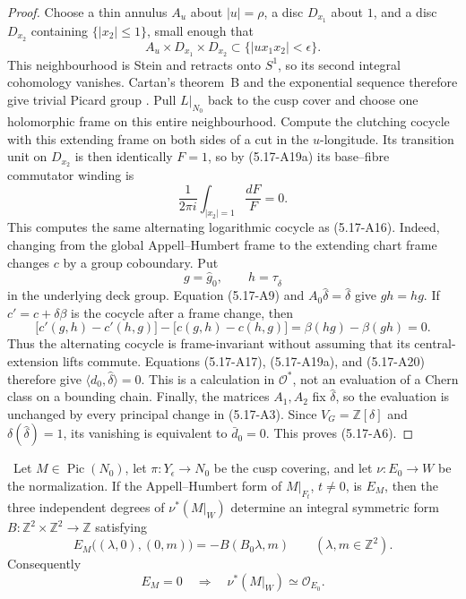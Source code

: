 \begin{proof}
Choose a thin annulus \(A_u\) about \(|u|=\rho\), a disc \(D_{x_1}\)
about \(1\), and a disc \(D_{x_2}\) containing \(\{|x_2|\le1\}\), small
enough that
\[
 A_u\times D_{x_1}\times D_{x_2}
 \subset\{|ux_1x_2|<\epsilon\}.
\tag{5.17-A19c}
\]
This neighbourhood is Stein and retracts onto \(S^1\), so its second
integral cohomology vanishes.  Cartan's theorem~B and the exponential
sequence therefore give trivial Picard group
\cite[\S2, fundamental theorem, p.~81]{Cartan1957}%
\cite[Proposition~6.28 and equations~(6.35)--(6.36),
pp.~180--182]{Lee2024}.  Pull \(L|_{N_0}\) back to
the cusp cover and choose one holomorphic frame on this entire
neighbourhood.  Compute the clutching cocycle with this extending frame on
both sides of a cut in the \(u\)-longitude.  Its transition unit on
\(D_{x_2}\) is then identically \(F=1\), so by (5.17-A19a) its
base--fibre commutator winding is
\[
 \frac1{2\pi i}\int_{|x_2|=1}\frac{dF}{F}=0.
\tag{5.17-A20}
\]
This computes the same alternating logarithmic cocycle as (5.17-A16).
Indeed, changing from the global Appell--Humbert frame to the extending
chart frame changes \(c\) by a group coboundary.  Put
\[
 g=\widehat g_0,
 \qquad
 h=\tau_{\widehat\delta}
\]
in the underlying deck group.  Equation (5.17-A9) and
\(A_0\widehat\delta=\widehat\delta\) give \(gh=hg\).  If
\(c'=c+\delta\beta\) is the cocycle after a frame change, then
\[
 \bigl[c'(g,h)-c'(h,g)\bigr]
 -\bigl[c(g,h)-c(h,g)\bigr]
 =\beta(hg)-\beta(gh)=0.
\]
Thus the alternating cocycle is frame-invariant without assuming that its
central-extension lifts commute.  Equations (5.17-A17), (5.17-A19a), and
(5.17-A20) therefore give
\(\langle d_0,\widehat\delta\rangle=0\).  This is a calculation in
\(\mathcal O^*\), not an evaluation of a Chern class on a bounding chain.
Finally, the matrices \(A_1,A_2\) fix
\(\widehat\delta\), so the evaluation is unchanged by every principal
change in (5.17-A3).  Since
\(V_G=\mathbb Z[\delta]\) and
\(\delta(\widehat\delta)=1\), its vanishing is equivalent to
\(\bar d_0=0\).  This proves (5.17-A6).
\end{proof}

\begin{lemma}
\label{lem:analytic-support-specialization}
\Verified\ Let \(M\in\operatorname{Pic}(N_0)\), let
\(\pi:Y_\epsilon\to N_0\) be the cusp covering, and let
\(\nu:E_0\to W\) be the normalization.  If the Appell--Humbert form of
\(M|_{F_t}\), \(t\ne0\), is \(E_M\), then the three independent degrees
of \(\nu^*(M|_W)\) determine an integral symmetric form
\(B:\mathbb Z^2\times\mathbb Z^2\to\mathbb Z\) satisfying
\[
 E_M\bigl((\lambda,0),(0,m)\bigr)
 =-B(B_0\lambda,m)
 \qquad(\lambda,m\in\mathbb Z^2).
\tag{5.17-A21}
\]
Consequently
\[
 E_M=0
 \quad\Longrightarrow\quad
 \nu^*(M|_W)\simeq\mathcal O_{E_0}.
\tag{5.17-A22}
\]
\end{lemma}

